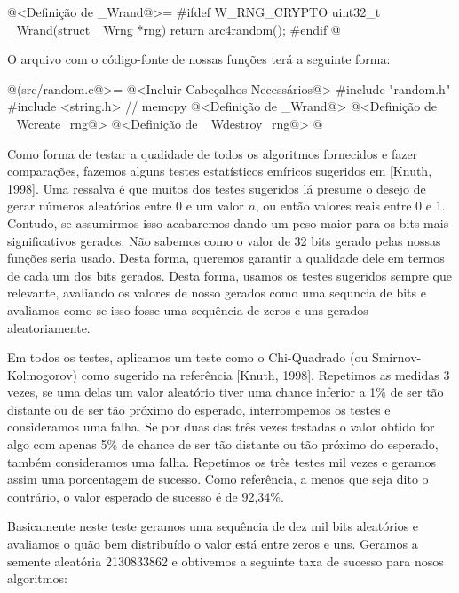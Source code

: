 \iniciocodigo
@<Definição de \_Wrand@>=
#ifdef W_RNG_CRYPTO
uint32_t _Wrand(struct _Wrng *rng){
  return arc4random();
}
#endif
@
\fimcodigo



O arquivo com o código-fonte de nossas funções terá a seguinte forma:


\iniciocodigo
@(src/random.c@>=
@<Incluir Cabeçalhos Necessários@>
#include "random.h"
#include <string.h> // memcpy
@<Definição de \_Wrand@>
@<Definição de \_Wcreate\_rng@>
@<Definição de \_Wdestroy\_rng@>
@
\fimcodigo


Como forma de testar a qualidade de todos os algoritmos fornecidos e
fazer comparações, fazemos alguns testes estatísticos emíricos
sugeridos em [Knuth, 1998]. Uma ressalva é que muitos dos testes
sugeridos lá presume o desejo de gerar números aleatórios entre 0 e um
valor $n$, ou então valores reais entre 0 e 1. Contudo, se assumirmos
isso acabaremos dando um peso maior para os bits mais significativos
gerados. Não sabemos como o valor de 32 bits gerado pelas nossas
funções seria usado. Desta forma, queremos garantir a qualidade dele
em termos de cada um dos bits gerados. Desta forma, usamos os testes
sugeridos sempre que relevante, avaliando os valores de nosso gerados
como uma sequncia de bits e avaliamos como se isso fosse uma sequência
de zeros e uns gerados aleatoriamente.

Em todos os testes, aplicamos um teste como o Chi-Quadrado (ou
Smirnov-Kolmogorov) como sugerido na referência [Knuth,
1998]. Repetimos as medidas 3 vezes, se uma delas um valor aleatório
tiver uma chance inferior a 1\% de ser tão distante ou de ser tão
próximo do esperado, interrompemos os testes e consideramos uma
falha. Se por duas das três vezes testadas o valor obtido for algo com
apenas 5\% de chance de ser tão distante ou tão próximo do esperado,
também consideramos uma falha. Repetimos os três testes mil vezes e
geramos assim uma porcentagem de sucesso. Como referência, a menos que
seja dito o contrário, o valor esperado de sucesso é de 92,34\%.


Basicamente neste teste geramos uma sequência de dez mil bits
aleatórios e avaliamos o quão bem distribuído o valor está entre zeros
e uns. Geramos a semente aleatória 2130833862 e obtivemos a seguinte
taxa de sucesso para nosos algoritmos:

